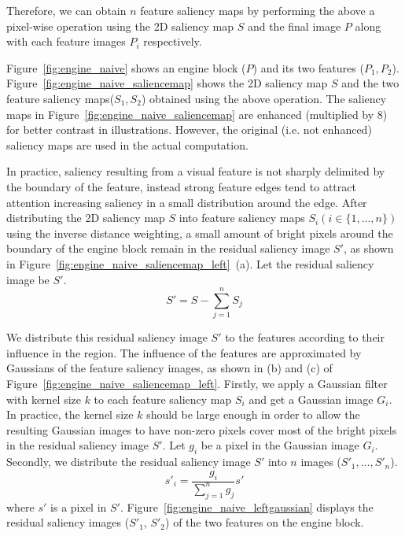 Therefore, we can obtain $ n $ feature saliency maps by performing the above a pixel-wise operation using the 2D saliency map $ S $ and the final image $ P $ along with each feature images $ P_{i} $ respectively.

Figure~\ref{fig:engine_naive} shows an engine block ($ P $) and its two features ($ P_{1} , P_{2} $).
Figure~\ref{fig:engine_naive_saliencemap} shows the 2D saliency map $ S $ and the two feature saliency maps($ S_{1} , S_{2} $) obtained using the above operation.
The saliency maps in Figure~\ref{fig:engine_naive_saliencemap} are enhanced (multiplied by 8) for better contrast in illustrations. However, the original (i.e. not enhanced) saliency maps are used in the actual computation.

In practice, saliency resulting from a visual feature is not sharply delimited by the boundary of the feature, instead strong feature edges tend to attract attention increasing saliency in a small distribution around the edge.
After distributing the 2D saliency map $ S $ into feature saliency maps $ S_{i} (i \in \{1, ... ,n\})$ using the inverse distance weighting, a small amount of bright pixels around the boundary of the engine block remain in the residual saliency image $ S' $, as shown in Figure~\ref{fig:engine_naive_saliencemap_left}~(a).
Let the residual saliency image be $ S' $.
\[ S'=S- \sum_{j=1}^{n} S_{j} \]

We distribute this residual saliency image $ S' $ to the features according to their influence in the region. The influence of the features are approximated by Gaussians of the feature saliency images, as shown in (b) and (c) of Figure~\ref{fig:engine_naive_saliencemap_left}.
Firstly, we apply a Gaussian filter with kernel size $ k $ to each feature saliency map $ S_{i} $ and get a Gaussian image $ G_{i} $.
In practice, the kernel size $ k $ should be large enough in order to allow the resulting Gaussian images to have non-zero pixels cover most of the bright pixels in the residual saliency image $ S' $.
Let $ g_{i} $ be a pixel in the Gaussian image $ G_{i} $.
Secondly, we distribute the residual saliency image $ S' $ into $ n $ images ($ S'_{1} , ... , S'_{n} $).
\[ s'_{i} = \frac{ g_{i} }{ \sum_{j=1}^{n} g_{j} }s' \]
where $ s' $ is a pixel in $ S' $.
Figure~\ref{fig:engine_naive_leftgaussian} displays the residual saliency images ($ S'_{1} $, $ S'_{2} $) of the two features on the engine block. 

